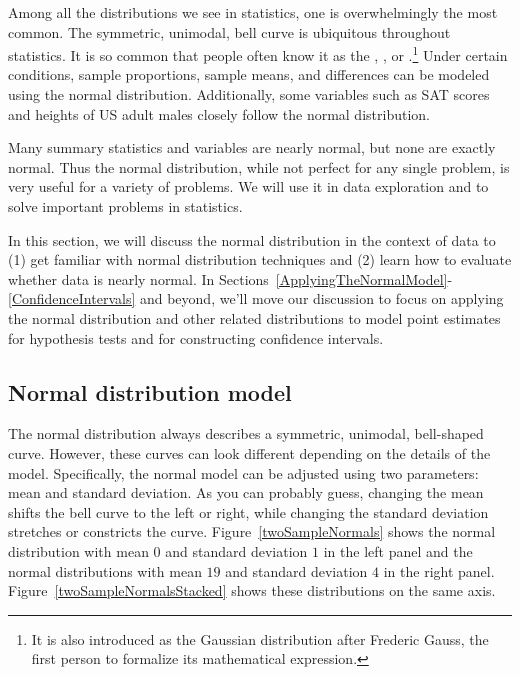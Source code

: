 
Among all the distributions we see in statistics, one is overwhelmingly the most common. The symmetric, unimodal, bell curve is ubiquitous throughout statistics. It is so common that people often know it as the , , or .\footnote{It is also introduced as the Gaussian distribution after Frederic Gauss, the first person to formalize its mathematical expression.} Under certain conditions, sample proportions, sample means, and differences can be modeled using the normal distribution. Additionally, some variables such as SAT scores and heights of US adult males closely follow the normal distribution.

\begin{termBox}{
Many summary statistics and variables are nearly normal, but none are exactly normal. Thus the normal distribution, while not perfect for any single problem, is very useful for a variety of problems. We will use it in data exploration and to solve important problems in statistics.\vspace{0.7mm}}
\end{termBox}

In this section, we will discuss the normal distribution in the context of data to (1) get familiar with normal distribution techniques and (2) learn how to evaluate whether data is nearly normal. In Sections~\ref{ApplyingTheNormalModel}-\ref{ConfidenceIntervals} and beyond, we'll move our discussion to focus on applying the normal distribution and other related distributions to model point estimates for hypothesis tests and for constructing confidence intervals.

\subsection{Normal distribution model}
\label{NormalDistributionModelSubsection}

The normal distribution  always describes a symmetric, unimodal, bell-shaped curve. However, these curves can look different depending on the details of the model. Specifically, the normal model can be adjusted using two parameters: mean and standard deviation. As you can probably guess, changing the mean shifts the bell curve to the left or right, while changing the standard deviation stretches or constricts the curve. Figure~\ref{twoSampleNormals} shows the normal distribution with mean $0$ and standard deviation $1$ in the left panel and the normal distributions with mean $19$ and standard deviation $4$ in the right panel. Figure~\ref{twoSampleNormalsStacked} shows these distributions on the same axis.


